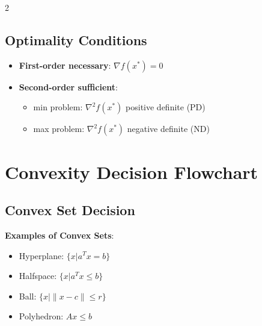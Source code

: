 \documentclass[10pt,a4paper,landscape]{article}
\begin{document}
\begin{multicols}{2}
\subsection*{Optimality Conditions}
\begin{itemize}
\item \textbf{First-order necessary}: $\nabla f(x^*) = 0$
\item \textbf{Second-order sufficient}: 
  \begin{itemize}
  \item min problem: $\nabla^2 f(x^*)$ positive definite (PD)
  \item max problem: $\nabla^2 f(x^*)$ negative definite (ND)
  \end{itemize}
\end{itemize}

\columnbreak

\section*{Convexity Decision Flowchart}

\subsection*{Convex Set Decision}
\begin{center}
\end{center}

\textbf{Examples of Convex Sets}:
\begin{itemize}
\item Hyperplane: $\{x | a^T x = b\}$
\item Halfspace: $\{x | a^T x \leq b\}$
\item Ball: $\{x | \|x - c\| \leq r\}$
\item Polyhedron: $Ax \leq b$
\end{itemize}


\end{multicols}
\end{document}
